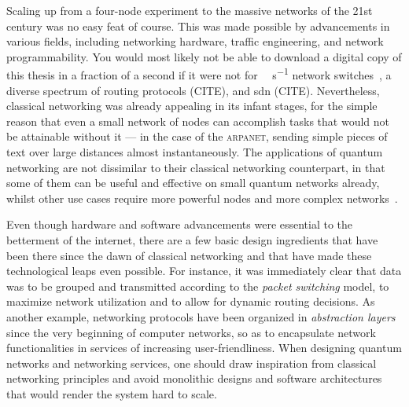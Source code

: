 Scaling up from a four-node experiment to the massive networks of the 21st century was no easy feat
of course. This was made possible by advancements in various fields, including networking hardware,
traffic engineering, and network programmability. You would most likely not be able to download a
digital copy of this thesis in a fraction of a second if it were not for \unit{\tera\bit\per\second}
network switches~\cite{broadcom_tomahawk, juniper_qfx5220}, a diverse spectrum of routing protocols
(CITE), and \acrlong{sdn} (CITE). Nevertheless, classical networking was already appealing in its
infant stages, for the simple reason that even a small network of nodes can accomplish tasks that
would not be attainable without it --- in the case of the \textsc{arpanet}, sending simple pieces of
text over large distances almost instantaneously. The applications of quantum networking are not
dissimilar to their classical networking counterpart, in that some of them can be useful and
effective on small quantum networks already, whilst other use cases require more powerful nodes and
more complex networks~\cite{wehner_2018_stages}.

Even though hardware and software advancements were essential to the betterment of the internet,
there are a few basic design ingredients that have been there since the dawn of classical networking
and that have made these technological leaps even possible. For instance, it was immediately clear
that data was to be grouped and transmitted according to the \emph{packet switching} model, to
maximize network utilization and to allow for dynamic routing decisions. As another example,
networking protocols have been organized in \emph{abstraction layers} since the very beginning of
computer networks, so as to encapsulate network functionalities in services of increasing
user-friendliness. When designing quantum networks and networking services, one should draw
inspiration from classical networking principles and avoid monolithic designs and software
architectures that would render the system hard to scale.

